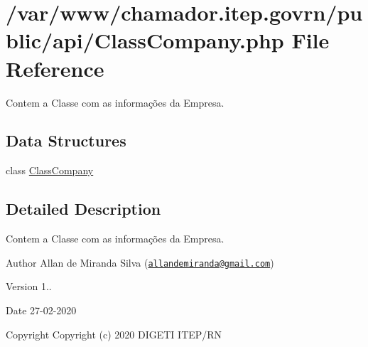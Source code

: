 \hypertarget{_class_company_8php}{}\section{/var/www/chamador.itep.\+govrn/public/api/\+Class\+Company.php File Reference}
\label{_class_company_8php}


Contem a Classe com as informações da Empresa.  


\subsection*{Data Structures}
\begin{DoxyCompactItemize}
\item 
class \hyperlink{class_class_company}{Class\+Company}
\end{DoxyCompactItemize}


\subsection{Detailed Description}
Contem a Classe com as informações da Empresa. 

\begin{DoxyAuthor}{Author}
Allan de Miranda Silva (\href{mailto:allandemiranda@gmail.com}{\tt allandemiranda@gmail.\+com}) 
\end{DoxyAuthor}
\begin{DoxyVersion}{Version}
1.. 
\end{DoxyVersion}
\begin{DoxyDate}{Date}
27-\/02-\/2020
\end{DoxyDate}
\begin{DoxyCopyright}{Copyright}
Copyright (c) 2020 D\+I\+G\+E\+TI I\+T\+E\+P/\+RN 
\end{DoxyCopyright}
